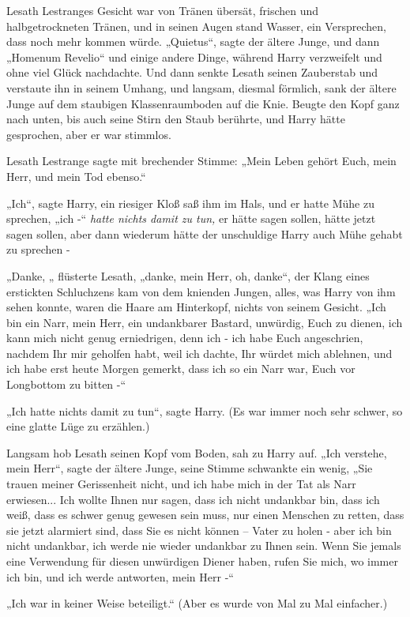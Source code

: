 {Lesath Lestranges Gesicht war von Tränen übersät, frischen und halbgetrockneten Tränen, und in seinen Augen stand Wasser, ein Versprechen, dass noch mehr kommen würde. „Quietus“, sagte der ältere Junge, und dann „Homenum Revelio“ und einige andere Dinge, während Harry verzweifelt und ohne viel Glück nachdachte. Und dann senkte Lesath seinen Zauberstab und verstaute ihn in seinem Umhang, und langsam, diesmal förmlich, sank der ältere Junge auf dem staubigen Klassenraumboden auf die Knie. Beugte den Kopf ganz nach unten, bis auch seine Stirn den Staub berührte, und Harry hätte gesprochen, aber er war stimmlos.

Lesath Lestrange sagte mit brechender Stimme: „Mein Leben gehört Euch, mein Herr, und mein Tod ebenso.“

„Ich“, sagte Harry, ein riesiger Kloß saß ihm im Hals, und er hatte Mühe zu sprechen, „ich -“ \emph{hatte nichts damit zu tun,} er hätte sagen sollen, hätte jetzt sagen sollen, aber dann wiederum hätte der unschuldige Harry auch Mühe gehabt zu sprechen -

„Danke, „ flüsterte Lesath, „danke, mein Herr, oh, danke“, der Klang eines erstickten Schluchzens kam von dem knienden Jungen, alles, was Harry von ihm sehen konnte, waren die Haare am Hinterkopf, nichts von seinem Gesicht. „Ich bin ein Narr, mein Herr, ein undankbarer Bastard, unwürdig, Euch zu dienen, ich kann mich nicht genug erniedrigen, denn ich - ich habe Euch angeschrien, nachdem Ihr mir geholfen habt, weil ich dachte, Ihr würdet mich ablehnen, und ich habe erst heute Morgen gemerkt, dass ich so ein Narr war, Euch vor Longbottom zu bitten -“

„Ich hatte nichts damit zu tun“, sagte Harry. (Es war immer noch sehr schwer, so eine glatte Lüge zu erzählen.)

Langsam hob Lesath seinen Kopf vom Boden, sah zu Harry auf. „Ich verstehe, mein Herr“, sagte der ältere Junge, seine Stimme schwankte ein wenig, „Sie trauen meiner Gerissenheit nicht, und ich habe mich in der Tat als Narr erwiesen... Ich wollte Ihnen nur sagen, dass ich nicht undankbar bin, dass ich weiß, dass es schwer genug gewesen sein muss, nur einen Menschen zu retten, dass sie jetzt alarmiert sind, dass Sie es nicht können -- Vater zu holen - aber ich bin nicht undankbar, ich werde nie wieder undankbar zu Ihnen sein. Wenn Sie jemals eine Verwendung für diesen unwürdigen Diener haben, rufen Sie mich, wo immer ich bin, und ich werde antworten, mein Herr -“

„Ich war in keiner Weise beteiligt.“ (Aber es wurde von Mal zu Mal einfacher.)

}
